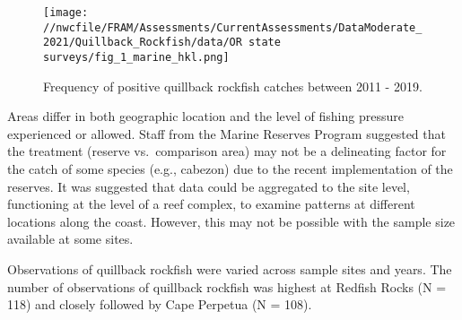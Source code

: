 \documentclass[11pt,
  english,
  a4paper,
]{article}
\begin{document}

\begin{figure}
\centering
\texttt{[image: //nwcfile/FRAM/Assessments/CurrentAssessments/DataModerate\_2021/Quillback\_Rockfish/data/OR state surveys/fig\_1\_marine\_hkl.png]}
\caption{Frequency of positive quillback rockfish catches between 2011 - 2019.\label{fig:pos-hkl}}
\end{figure}

\tagmcend\tagstructend


Areas differ in both geographic location and the level of fishing pressure experienced or allowed. Staff from the Marine Reserves Program suggested that the treatment (reserve vs.~comparison area) may not be a delineating factor for the catch of some species (e.g., cabezon) due to the recent implementation of the reserves. It was suggested that data could be aggregated to the site level, functioning at the level of a reef complex, to examine patterns at different locations along the coast. However, this may not be possible with the sample size available at some sites.

\leavevmode\tagmcend\tagstructend\par


Observations of quillback rockfish were varied across sample sites and years. The number of observations of quillback rockfish was highest at Redfish Rocks (N = 118) and closely followed by Cape Perpetua (N = 108).

\leavevmode\tagmcend\tagstructend\par

\begingroup\fontsize{10}{12}\selectfont
\begingroup\fontsize{10}{12}\selectfont
\end{document}
